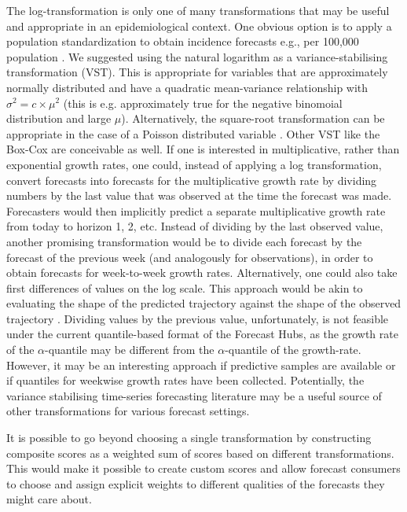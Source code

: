\documentclass{article}
\begin{document}
The log-transformation is only one of many transformations that may be useful and appropriate in an epidemiological context. One obvious option is to apply a population standardization to obtain incidence forecasts e.g., per 100,000 population \citep{abbottEvaluatingEpidemiologicallyMotivated2022}. 
We suggested using the natural logarithm as a variance-stabilising transformation (VST). This is appropriate for variables that are approximately normally distributed and have a quadratic mean-variance relationship with $\sigma^2 = c \times \mu^2$ (this is e.g. approximately true for the negative binomoial distribution and large $\mu$). Alternatively, the square-root transformation can be appropriate in the case of a Poisson distributed variable \citep{dunnGeneralizedLinearModels2018}. Other VST like the Box-Cox \citep{boxAnalysisTransformations1964} are conceivable as well.
If one is interested in multiplicative, rather than exponential growth rates, one could, instead of applying a log transformation, convert forecasts into forecasts for the multiplicative growth rate by dividing numbers by the last value that was observed at the time the forecast was made. Forecasters would then implicitly predict a separate multiplicative growth rate from today to horizon 1, 2, etc. 
Instead of dividing by the last observed value, another promising transformation would be to divide each forecast by the forecast of the previous week (and analogously for observations), in order to obtain forecasts for week-to-week growth rates. Alternatively, one could also take first differences of values on the log scale. This approach would be akin to evaluating the shape of the predicted trajectory against the shape of the observed trajectory \citep[for a different approach to evaluating the shape of a forecast, see][]{srivastavaShapebasedEvaluationEpidemic2022}. Dividing values by the previous value, unfortunately, is not feasible under the current quantile-based format of the Forecast Hubs, as the growth rate of the $\alpha$-quantile may be different from the $\alpha$-quantile of the growth-rate. However, it may be an interesting approach if predictive samples are available or if quantiles for weekwise growth rates have been collected. Potentially, the variance stabilising time-series forecasting literature may be a useful source of other transformations for various forecast settings. 

It is possible to go beyond choosing a single transformation by constructing composite scores as a weighted sum of scores based on different transformations. This would make it possible to create custom scores and allow forecast consumers to choose and assign explicit weights to different qualities of the forecasts they might care about.
\end{document}

